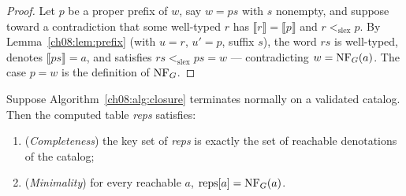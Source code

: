\begin{proof}
Let $p$ be a proper prefix of $w$, say $w=ps$ with $s$ nonempty, and
suppose toward a contradiction that some well-typed $r$ has
$\llbracket r\rrbracket=\llbracket p\rrbracket$ and $r<_{\mathrm{slex}}p$.
By Lemma~\ref{ch08:lem:prefix} (with $u=r$, $u'=p$, suffix $s$), the word
$rs$ is well-typed, denotes $\llbracket ps\rrbracket=a$, and satisfies
$rs<_{\mathrm{slex}}ps=w$ --- contradicting $w=\mathrm{NF}_G(a)$. The case $p=w$ is
the definition of $\mathrm{NF}_G$.
\end{proof}

\begin{theorem}\label{ch08:thm:soundness}
Suppose Algorithm~\ref{ch08:alg:closure} terminates normally on a validated
catalog. Then the computed table \emph{reps} satisfies:
\begin{enumerate}
\item (\emph{Completeness}) the key set of \emph{reps} is exactly the set of
  reachable denotations of the catalog;
\item (\emph{Minimality}) for every reachable $a$,
  $\text{reps}[a]=\mathrm{NF}_G(a)$.
\end{enumerate}
\end{theorem}

